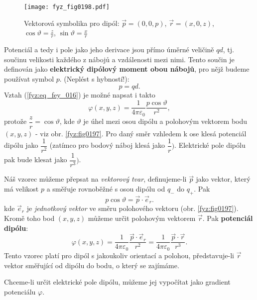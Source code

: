   \begin{figure}[ht!] %
    \centering
    \texttt{[image: fyz\_fig0198.pdf]}
    \caption{Vektorová symbolika pro dipól: \(\vec{p} = (0, 0, p)\), \(\vec{r} = (x, 0, z)\), 
             \(\cos\vartheta = \frac{z}{r}\), \(\sin\vartheta = \frac{x}{r}\)}
    \label{fyz:fig0198}
  \end{figure}
  Potenciál a tedy i pole jako jeho derivace jsou přímo úměrné veličině \(qd\), tj. součinu
  velikosti každého z nábojů a vzdálenosti mezi nimi. Tento součin je definován jako
  \textbf{elektrický dipólový moment obou nábojů}, pro nějž budeme používat symbol \(p\). (Neplést s
  hybností!):
  \begin{equation}\label{fyz:eq_fey_017}
    p = qd.
  \end{equation}
  Vztah (\ref{fyz:eq_fey_016}) je možné napsat i takto
  \begin{equation}\label{fyz:eq_fey_018}
    \varphi(x,y,z) = \dfrac{1}{4\pi\varepsilon_0}\dfrac{p\cos\vartheta}{r^2},
  \end{equation}
  protože \(\dfrac{z}{r} = \cos\vartheta\), kde \(\vartheta\) je úhel mezi osou dipólu a polohovým
  vektorem bodu \((x, y, z)\) - viz obr. \ref{fyz:fig0197}. Pro daný směr vzhledem k ose klesá
  potenciál dipólu jako \(\dfrac{1}{r^2}\) (zatímco pro bodový náboj klesá jako \(\dfrac{1}{r})\).
  Elektrické pole dipólu pak bude klesat jako \(\dfrac{1}{r^3})\).

  Náš vzorec můžeme přepsat na \emph{vektorový tvar}, definujeme-li \(\vec{p}\) jako vektor, který
  má velikost \(p\) a směřuje rovnoběžné s osou dipólu od \(q_-\) do \(q_+\). Pak
   \begin{equation}\label{fyz:eq_fey_019}
    p\cos\vartheta = \vec{p}\cdot\vec{e}_r.
  \end{equation}
  kde \(\vec{e}_r\) je \emph{jednotkový vektor} ve směru polohového vektoru (obr. \ref{fyz:fig0197}).
  Kromě toho bod \((x, y, z)\) můžeme určit polohovým vektorem \(\vec{r}\). Pak \textbf{potenciál
  dipólu}:
  \begin{equation}\label{fyz:eq_fey_020}
    \varphi(x,y,z) = \dfrac{1}{4\pi\varepsilon_0}\dfrac{\vec{p}\cdot\vec{e}_r}{r^2}
                   = \dfrac{1}{4\pi\varepsilon_0}\dfrac{\vec{p}\cdot\vec{r}}{r^3}.
  \end{equation}
  Tento vzorec platí pro dipól s jakoukoliv orientací a polohou, představuje-li \(\vec{r}\) vektor
  směřující od dipólu do bodu, o který se zajímáme.

  Chceme-li určit elektrické pole dipólu, můžeme jej vypočítat jako gradient potenciálu 
  \(\varphi\).

